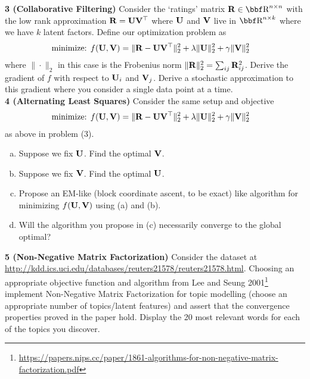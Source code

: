 \documentclass[12pt,letterpaper,fleqn]{hmcpset}
\begin{document}
\textbf{3 (Collaborative Filtering)} Consider the `ratings' matrix $\Rb\in\RR^{n\times n}$
with the low rank approximation ${\bf R} = {\bf U} {\bf V}^\top$ where ${\bf U}$ and ${\bf V}$ live in
$\RR^{n\times k}$ where we have $k$ latent factors. Define our optimization problem as
\begin{align*}
    \text{minimize: } & f({\bf U},{\bf V}) = \|{\bf R} - {\bf U}{\bf V}^\top\|_2^2 + \lambda\|{\bf U}\|_2^2 + \gamma\|{\bf V}\|_2^2
\end{align*}
where $\|\cdot\|_2$ in this case is the Frobenius norm $\|{\bf R}\|_2^2 = \sum_{ij}{\bf R}_{ij}^2$.
Derive the gradient of $f$ with respect to ${\bf U}_i$ and ${\bf V}_j$. Derive a stochastic
approximation to this gradient where you consider a single data point at a time.\\

\textbf{4 (Alternating Least Squares)} Consider the same setup and objective
\begin{align*}
    \text{minimize: } & f({\bf U},{\bf V}) = \|{\bf R} - {\bf U}{\bf V}^\top\|_2^2 + \lambda\|{\bf U}\|_2^2 + \gamma\|{\bf V}\|_2^2
\end{align*}
as above in problem (3).
\begin{enumerate}[(a)]
    \item Suppose we fix ${\bf U}$. Find the optimal ${\bf V}$.
    \item Suppose we fix ${\bf V}$. Find the optimal ${\bf U}$.
    \item Propose an EM-like (block coordinate ascent, to be exact) like algorithm
        for minimizing $f({\bf U},{\bf V})$ using (a) and (b).
    \item Will the algorithm you propose in (c) necessarily converge to the global
        optimal?
\end{enumerate}

\textbf{5 (Non-Negative Matrix Factorization)} Consider the dataset at
\url{http://kdd.ics.uci.edu/databases/reuters21578/reuters21578.html}. Choosing an appropriate
objective function and algorithm from Lee and Seung 2001\footnote{\url{https://papers.nips.cc/paper/1861-algorithms-for-non-negative-matrix-factorization.pdf}}
implement Non-Negative Matrix Factorization for topic modelling (choose an appropriate number
of topics/latent features) and assert that the convergence properties proved in the paper hold. 
Display the 20 most relevant words for each of the topics you discover.
\end{document}
